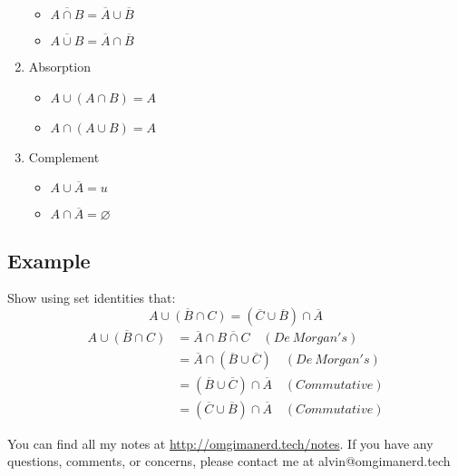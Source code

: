 \documentclass[letterpaper, 12pt]{math}
\begin{document}
\begin{enumerate}
  \begin{itemize}
    \item \( \overline{A \cap B} = \overline{A} \cup \overline{B} \)
    \item \( \overline{A \cup B} = \overline{A} \cap \overline{B} \)
  \end{itemize}
  \item Absorption
  \begin{itemize}
    \item \( A \cup (A \cap B) = A \)
    \item \( A \cap (A \cup B) = A \)
  \end{itemize}
  \item Complement
  \begin{itemize}
    \item \( A \cup \overline{A} = u \)
    \item \( A \cap \overline{A} = \varnothing \)
  \end{itemize}
\end{enumerate}

\subsection*{Example}
Show using set identities that:
\[ \overline{A \cup (B \cap C)} = (\overline{C} \cup \overline{B}) \cap
   \overline{A} \]
\begin{align*}
  \overline{A \cup (B \cap C)} &=
    \overline{A} \cap \overline{B \cap C} \quad (De\ Morgan's) \\
  &= \overline{A} \cap (\overline{B} \cup \overline{C}) \quad (De\ Morgan's) \\
  &= (\overline{B} \cup \overline{C}) \cap \overline{A} \quad (Commutative) \\
  &= (\overline{C} \cup \overline{B}) \cap \overline{A} \quad (Commutative)
\end{align*}

\begin{center}
  You can find all my notes at \url{http://omgimanerd.tech/notes}. If you have
  any questions, comments, or concerns, please contact me at
  alvin@omgimanerd.tech
\end{center}
\end{document}
